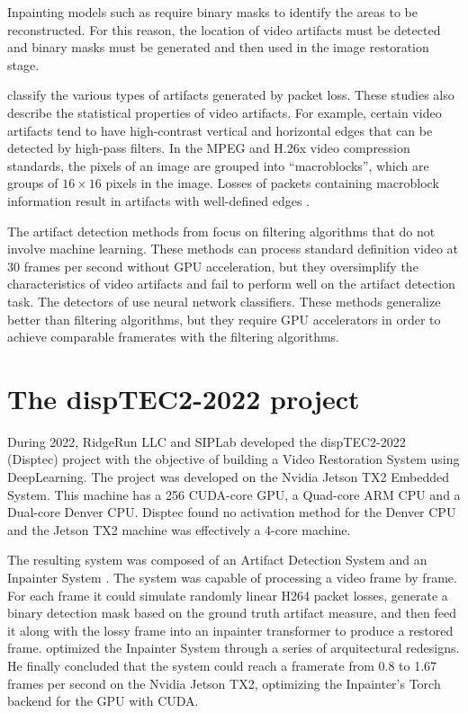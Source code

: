 Inpainting models such as \cite{Li2022} require binary masks to identify the areas to be reconstructed. For this reason, the location of video artifacts must be detected and binary masks must be generated and then used in the image restoration stage.

\cite{Greengrass2009, Glavota2016} classify the various types of artifacts generated by packet loss. These studies also describe the statistical properties of video artifacts. For example, certain video artifacts tend to have high-contrast vertical and horizontal edges that can be detected by high-pass filters. In the MPEG and H.26x video compression standards, the pixels of an image are grouped into ``macroblocks'', which are groups of $16 \times 16$ pixels in the image. Losses of packets containing macroblock information result in artifacts with well-defined edges \cite{Vranjes2019, Glavota2018}.

The artifact detection methods from \cite{Vranjes2018, Glavota2018} focus on filtering algorithms that do not involve machine learning. These methods can process standard definition video at 30 frames per second without GPU acceleration, but they oversimplify the characteristics of video artifacts and fail to perform well on the artifact detection task. The detectors of \cite{Goodall2019, Rajasekar2020} use neural network classifiers. These methods generalize better than filtering algorithms, but they require GPU accelerators in order to achieve comparable framerates with the filtering algorithms.

\section{The dispTEC2-2022 project}
\label{sec:intro_disptec}

During 2022, RidgeRun LLC and SIPLab developed the dispTEC2-2022 (Disptec) project with the objective of building a Video Restoration System using DeepLearning. The project was developed on the Nvidia Jetson TX2 Embedded System. This machine has a 256 CUDA-core GPU, a Quad-core ARM CPU and a Dual-core Denver CPU. Disptec found no activation method for the Denver CPU and the Jetson TX2 machine was effectively a 4-core machine.

The resulting system was composed of an Artifact Detection System and an Inpainter System \cite{Brenes2022}. The system was capable of processing a video frame by frame. For each frame it could simulate randomly linear H264 packet losses, generate a binary detection mask based on the ground truth artifact measure, and then feed it along with the lossy frame into an inpainter transformer to produce a restored frame. \cite{Brenes2022} optimized the Inpainter System through a series of arquitectural redesigns. He finally concluded that the system could reach a framerate from 0.8 to 1.67 frames per second on the Nvidia Jetson TX2, optimizing the Inpainter's Torch backend for the GPU with CUDA.

